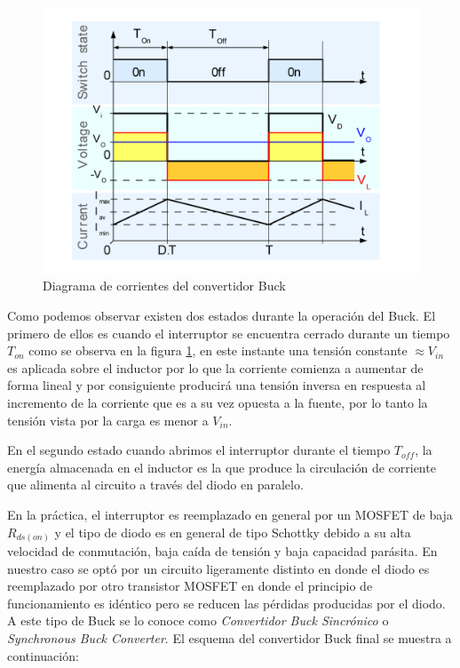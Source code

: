 \documentclass[12pt]{report}
\begin{document}
	\begin{figure}[H]
		\centering
		\includegraphics[width=\textwidth,height=\textheight,keepaspectratio]{buck_currents}
		\caption{Diagrama de corrientes del convertidor Buck}
		\label{buck:currents}
	\end{figure}

	Como podemos observar existen dos estados durante la operación del Buck. El primero de ellos es cuando el interruptor se encuentra cerrado durante un tiempo $T_{on}$ como se observa en la figura \ref{buck:currents}, en este instante una tensión constante $\approx V_{in}$ es aplicada sobre el inductor por lo que la corriente comienza a aumentar de forma lineal y por consiguiente producirá una tensión inversa en respuesta al incremento de la corriente que es a su vez opuesta a la fuente, por lo tanto la tensión vista por la carga es menor a $V_{in}$.
	
	En el segundo estado cuando abrimos el interruptor durante el tiempo $T_{off}$, la energía almacenada en el inductor es la que produce la circulación de corriente que alimenta al circuito a través del diodo en paralelo.
	
	En la práctica, el interruptor es reemplazado en general por un MOSFET de baja $R_{ds(on)}$ y el tipo de diodo es en general de tipo Schottky debido a su alta velocidad de conmutación, baja caída de tensión y baja capacidad parásita. En nuestro caso se optó por un circuito ligeramente distinto en donde el diodo es reemplazado por otro transistor MOSFET en donde el principio de funcionamiento es idéntico pero se reducen las pérdidas producidas por el diodo. A este tipo de Buck se lo conoce como \textit{Convertidor Buck Sincrónico} o \textit{Synchronous Buck Converter}. El esquema del convertidor Buck final se muestra a continuación:
\end{document}
